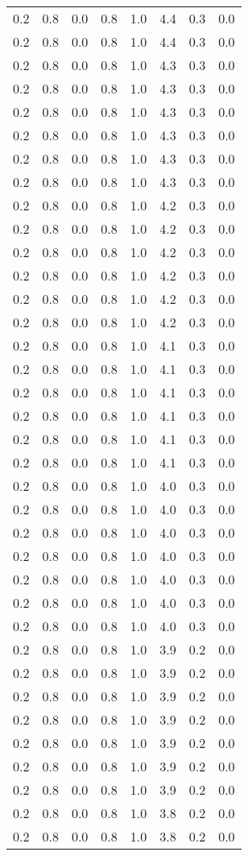 \begin{tabular}{L{1in}|L{1in}|L{1in}|L{1in}|L{1in}|L{1in}|L{1in}|L{1in}}
0.2&0.8&0.0&0.8&1.0&4.4&0.3&0.0\\
0.2&0.8&0.0&0.8&1.0&4.4&0.3&0.0\\
0.2&0.8&0.0&0.8&1.0&4.3&0.3&0.0\\
0.2&0.8&0.0&0.8&1.0&4.3&0.3&0.0\\
0.2&0.8&0.0&0.8&1.0&4.3&0.3&0.0\\
0.2&0.8&0.0&0.8&1.0&4.3&0.3&0.0\\
0.2&0.8&0.0&0.8&1.0&4.3&0.3&0.0\\
0.2&0.8&0.0&0.8&1.0&4.3&0.3&0.0\\
0.2&0.8&0.0&0.8&1.0&4.2&0.3&0.0\\
0.2&0.8&0.0&0.8&1.0&4.2&0.3&0.0\\
0.2&0.8&0.0&0.8&1.0&4.2&0.3&0.0\\
0.2&0.8&0.0&0.8&1.0&4.2&0.3&0.0\\
0.2&0.8&0.0&0.8&1.0&4.2&0.3&0.0\\
0.2&0.8&0.0&0.8&1.0&4.2&0.3&0.0\\
0.2&0.8&0.0&0.8&1.0&4.1&0.3&0.0\\
0.2&0.8&0.0&0.8&1.0&4.1&0.3&0.0\\
0.2&0.8&0.0&0.8&1.0&4.1&0.3&0.0\\
0.2&0.8&0.0&0.8&1.0&4.1&0.3&0.0\\
0.2&0.8&0.0&0.8&1.0&4.1&0.3&0.0\\
0.2&0.8&0.0&0.8&1.0&4.1&0.3&0.0\\
0.2&0.8&0.0&0.8&1.0&4.0&0.3&0.0\\
0.2&0.8&0.0&0.8&1.0&4.0&0.3&0.0\\
0.2&0.8&0.0&0.8&1.0&4.0&0.3&0.0\\
0.2&0.8&0.0&0.8&1.0&4.0&0.3&0.0\\
0.2&0.8&0.0&0.8&1.0&4.0&0.3&0.0\\
0.2&0.8&0.0&0.8&1.0&4.0&0.3&0.0\\
0.2&0.8&0.0&0.8&1.0&4.0&0.3&0.0\\
0.2&0.8&0.0&0.8&1.0&3.9&0.2&0.0\\
0.2&0.8&0.0&0.8&1.0&3.9&0.2&0.0\\
0.2&0.8&0.0&0.8&1.0&3.9&0.2&0.0\\
0.2&0.8&0.0&0.8&1.0&3.9&0.2&0.0\\
0.2&0.8&0.0&0.8&1.0&3.9&0.2&0.0\\
0.2&0.8&0.0&0.8&1.0&3.9&0.2&0.0\\
0.2&0.8&0.0&0.8&1.0&3.9&0.2&0.0\\
0.2&0.8&0.0&0.8&1.0&3.8&0.2&0.0\\
0.2&0.8&0.0&0.8&1.0&3.8&0.2&0.0\\

\end{tabular}

